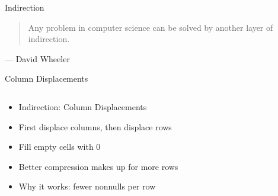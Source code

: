 \begin{frame}{Indirection}
	\begin{quotation}
		Any problem in computer science can be solved by another layer of indirection.
	\end{quotation}
	\vspace*{-1em}
	\begin{flushright}
		\textup{
		--- David Wheeler
		}
	\end{flushright}
\end{frame}

\begin{frame}{Column Displacements}
	\begin{columns}
		\begin{column}[T]{0.6\textwidth}
			\begin{itemize}[<+->]
				\itemspacing{20pt}
				\item Indirection: Column Displacements
				\item First displace columns, then displace rows
				\item Fill empty cells with 0
				\item Better compression makes up for more rows
				\item Why it works: fewer nonnulls per row
			\end{itemize}
		\end{column}
		

\end{columns}
\end{frame}
